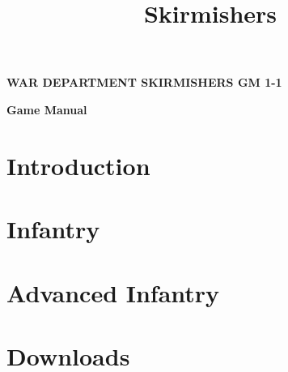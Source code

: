 \documentclass{article}
\title{Skirmishers}
\author{}
\date{}
\newcommand{\mysectiontitle}{}
\newcommand{\newsection}[2]{\renewcommand{\mysectiontitle}{#2}\section{#1}}
\begin{document}
\makeatletter
{}

\begin{center}
  \fontsize{30}{37}\bfseries\selectfont\MakeUppercase{War Department}
  \fontsize{50}{60}\bfseries\selectfont\MakeUppercase{Skirmishers}
  \fontsize{30}{37}\bfseries\selectfont\MakeUppercase{GM 1-1}

  \LARGE\bfseries{Game Manual}
\end{center}

\newsection{Introduction}{introduction}



\newpage

\newsection{Infantry}{infantry}



\newsection{Advanced Infantry}{advanced-infantry}



\newpage

\newsection{Downloads}{downloads}
\label{sec:downloads}



\newpage
\end{document}
